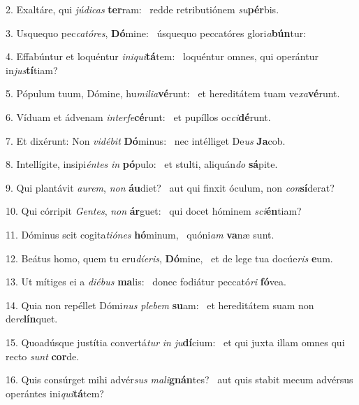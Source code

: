 2. Exaltáre, qui \textit{jú}\textit{di}\textit{cas} \textbf{ter}ram: \ast\  redde retributiónem \textit{su}\textbf{pér}bis.\

3. Usquequo pec\textit{ca}\textit{tó}\textit{res}, \textbf{Dó}mine: \ast\  úsquequo peccatóres glori\textit{a}\textbf{bún}tur:\

4. Effabúntur et loquéntur \textit{in}\textit{i}\textit{qui}\textbf{tá}tem: \ast\  loquéntur omnes, qui operántur in\textit{jus}\textbf{tí}tiam?\

5. Pópulum tuum, Dómine, hu\textit{mi}\textit{li}\textit{a}\textbf{vé}runt: \ast\  et hereditátem tuam ve\textit{xa}\textbf{vé}runt.\

6. Víduam et ádvenam \textit{in}\textit{ter}\textit{fe}\textbf{cé}runt: \ast\  et pupíllos oc\textit{ci}\textbf{dé}runt.\

7. Et dixérunt: Non \textit{vi}\textit{dé}\textit{bit} \textbf{Dó}minus: \ast\  nec intélliget De\textit{us} \textbf{Ja}cob.\

8. Intellígite, insipi\textit{én}\textit{tes} \textit{in} \textbf{pó}pulo: \ast\  et stulti, aliquán\textit{do} \textbf{sá}pite.\

9. Qui plantávit \textit{au}\textit{rem}, \textit{non} \textbf{áu}diet? \ast\  aut qui finxit óculum, non \textit{con}\textbf{sí}derat?\

10. Qui córripit \textit{Gen}\textit{tes}, \textit{non} \textbf{ár}guet: \ast\  qui docet hóminem \textit{sci}\textbf{én}tiam?\

11. Dóminus scit cogita\textit{ti}\textit{ó}\textit{nes} \textbf{hó}minum, \ast\  quóni\textit{am} \textbf{va}næ sunt.\

12. Beátus homo, quem tu eru\textit{dí}\textit{e}\textit{ris}, \textbf{Dó}mine, \ast\  et de lege tua docúe\textit{ris} \textbf{e}um.\

13. Ut mítiges ei a \textit{di}\textit{é}\textit{bus} \textbf{ma}lis: \ast\  donec fodiátur peccató\textit{ri} \textbf{fó}vea.\

14. Quia non repéllet Dómi\textit{nus} \textit{ple}\textit{bem} \textbf{su}am: \ast\  et hereditátem suam non de\textit{re}\textbf{lín}quet.\

15. Quoadúsque justítia convertá\textit{tur} \textit{in} \textit{ju}\textbf{dí}cium: \ast\  et qui juxta illam omnes qui recto \textit{sunt} \textbf{cor}de.\

16. Quis consúrget mihi advér\textit{sus} \textit{ma}\textit{li}\textbf{gnán}tes? \ast\  aut quis stabit mecum advérsus operántes ini\textit{qui}\textbf{tá}tem?\

